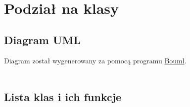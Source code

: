 \documentclass[12pt,a4paper]{article}
\begin{document}
\newpage
\section{Podział na klasy}
\subsection{Diagram UML}
Diagram został wygenerowany za pomocą programu \href{https://www.bouml.fr/}{Bouml}.\\ \
\begin{figure}
 \centering 
 
\end{figure}

\newpage

\subsection{Lista klas i ich funkcje}
\end{document}
